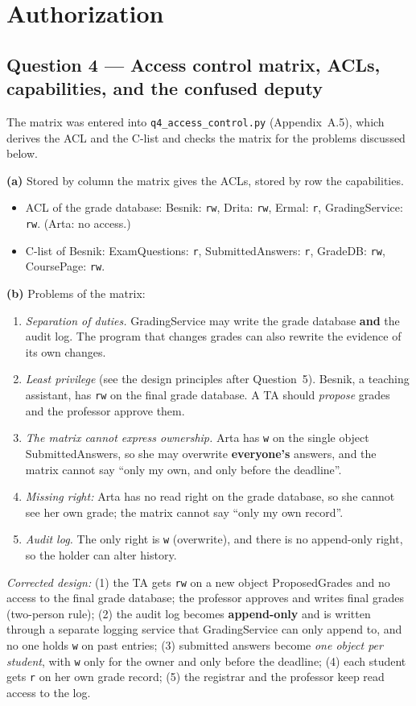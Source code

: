 \documentclass[11pt,a4paper]{article}
\begin{document}
\clearpage
\section*{Authorization}

\subsection*{Question 4 --- Access control matrix, ACLs, capabilities, and the confused deputy}
The matrix was entered into \texttt{q4\_access\_control.py} (Appendix~A.5), which derives the ACL and the C-list
and checks the matrix for the problems discussed below.

\textbf{(a)} Stored by column the matrix gives the ACLs, stored by row the capabilities.
\begin{itemize}
\item ACL of the grade database: Besnik: \texttt{rw}, Drita: \texttt{rw}, Ermal: \texttt{r},
GradingService: \texttt{rw}. (Arta: no access.)
\item C-list of Besnik: ExamQuestions: \texttt{r}, SubmittedAnswers: \texttt{r}, GradeDB: \texttt{rw},
CoursePage: \texttt{rw}.
\end{itemize}

\textbf{(b)} Problems of the matrix:
\begin{enumerate}
\item \emph{Separation of duties.} GradingService may write the grade database \textbf{and} the audit log. The
program that changes grades can also rewrite the evidence of its own changes.
\item \emph{Least privilege} (see the design principles after Question~5). Besnik, a teaching assistant, has \texttt{rw} on the final grade database.
A TA should \emph{propose} grades and the professor approve them.
\item \emph{The matrix cannot express ownership.} Arta has \texttt{w} on the single object
SubmittedAnswers, so she may overwrite \textbf{everyone's} answers, and the matrix cannot say ``only my own, and only
before the deadline''.
\item \emph{Missing right:} Arta has no read right on the grade database, so she cannot see her own grade; the
matrix cannot say ``only my own record''.
\item \emph{Audit log.} The only right is \texttt{w} (overwrite), and there is no append-only right, so the
holder can alter history.
\end{enumerate}
\emph{Corrected design:} (1) the TA gets \texttt{rw} on a new object ProposedGrades and no access to the final
grade database; the professor approves and writes final grades (two-person rule); (2) the audit log becomes
\textbf{append-only} and is written through a separate logging service that GradingService can only append to,
and no one holds \texttt{w} on past entries; (3) submitted answers become \emph{one object per student}, with
\texttt{w} only for the owner and only before the deadline; (4) each student gets \texttt{r} on her own grade
record; (5) the registrar and the professor keep read access to the log.
\end{document}
